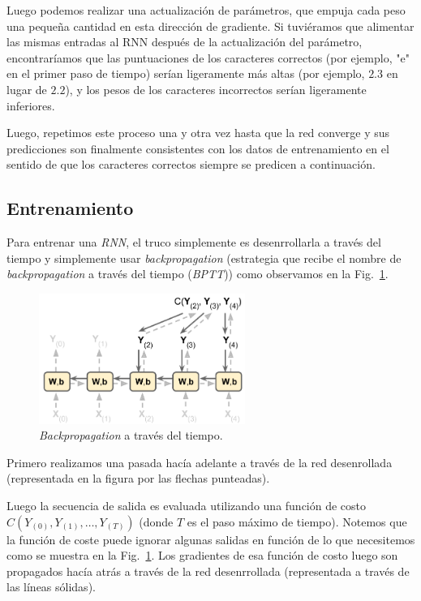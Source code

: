 \documentclass[a4paper,12pt]{article}
\begin{document}
Luego podemos realizar una actualización de parámetros, que empuja cada peso una pequeña cantidad en esta dirección de gradiente. Si tuviéramos que alimentar las mismas entradas al RNN después de la actualización del parámetro, encontraríamos que las puntuaciones de los caracteres correctos (por ejemplo, "e" en el primer paso de tiempo) serían ligeramente más altas (por ejemplo, $2.3$ en lugar de $2.2$), y los pesos de los caracteres incorrectos serían ligeramente inferiores.

Luego, repetimos este proceso una y otra vez hasta que la red converge y sus predicciones son finalmente consistentes con los datos de entrenamiento en el sentido de que los caracteres correctos siempre se predicen a continuación.

\subsection{Entrenamiento}
Para entrenar una \textit{RNN}, el truco simplemente es desenrrollarla a través del tiempo y simplemente usar \textit{backpropagation} (estrategia que recibe el nombre de \textit{backpropagation} a través del tiempo (\textit{BPTT})) como observamos en la Fig.~\ref{fig:BPTT}.

\begin{figure}[H]
	\begin{center}				
		\includegraphics[width=0.6\textwidth]{tesis_40.png}
		\caption{\textit{Backpropagation} a través del tiempo.\citep{geron}}
		\label{fig:BPTT}
	\end{center}
\end{figure}

Primero realizamos una pasada hacía adelante a través de la red desenrollada (representada en la figura por las flechas punteadas). 

Luego la secuencia de salida es evaluada utilizando una función de costo $C(Y_{(0)}, Y_{(1)}, \dots, Y_{(T)})$ (donde $T$ es el paso máximo de tiempo). Notemos que la función de coste puede ignorar algunas salidas en función de lo que necesitemos como se muestra en la Fig.~\ref{fig:BPTT}.
Los gradientes de esa función de costo luego son propagados hacía atrás a través de la red desenrrollada (representada a través de las líneas sólidas).
\end{document}
